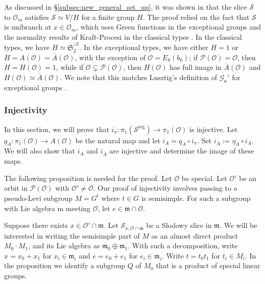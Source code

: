 \documentclass{amsart}
\theoremstyle{definition}
\DeclareMathOperator{\reg}{reg}
\newcommand{\cG}{\mathcal{G}}
\newcommand{\cP}{\mathcal{P}}
\newcommand{\cS}{\mathcal{S}}
\newcommand{\bc}{{\mathbf{c}}}
\newcommand{\m}{\mathrm{m}}
\newcommand{\sP}{\mathcal{P}}
\newcommand{\frakm}{\mathfrak{m}}
\newcommand{\frakS}{\mathfrak{S}}
\newcommand{\Ab}{\bar{A}}
\newcommand{\0}{\mathcal{O}}
\begin{document}
As discussed in \S\ref{subsec:new_general_set_up}, it was shown in \cite{FJLS23} that the slice $\cS$ to $\0_m$
satisfies $\cS \simeq V/H$ for a finite group $H$.
The proof relied on the fact that $\cS$ is unibranch at $x \in \0_m$, which uses Green functions in the exceptional groups
and the normality results of Kraft-Procesi in the classical types \cite{Kraft-Procesi:classical}.  In the classical types, we have $H \simeq \frakS^{|J|}_2$. In the exceptional types, we have either $H=1$ or $H=A(\0)=\Ab(\0)$, with the exception of $\0 = E_8(b_6)$; if $\cP(\0) = \0$, then $H=H(\0)=1$, while if $\0 \subsetneq \cP(\0)$, then $H(\0)$ has full image in $\Ab(\0)$ and $H(\0) \simeq \Ab(\0)$.
We note that this matches Lusztig's definition of $\cG_\bc'$ for exceptional groups \cite{Lusztig:unipotent}.

\subsubsection{Injectivity} \label{subsubsec:injective}
In this section, we will prove that 
$i_\pi: \pi_1(\cS^{\reg}) \to \pi_1(\0)$ is injective.
Let $q_A:\pi_1(\0) \to A(\0)$ be the natural map and let
$i_A = q_A\circ i_\pi$.   Set $i_{\Ab}:= \eta_A\circ i_A$.
We will also show that $i_A$ and $i_{\Ab}$ are injective and 
determine the image of these maps.

The following proposition is needed for the proof.
Let $\0$ be special.  Let $\0'$ be an orbit in $\sP(\0)$ with $\0' \neq \0$.
Our proof of injectivity involves passing to a pseudo-Levi subgroup 
$M=G^t$ where $t \in G$ is semisimple. 
For such a subgroup with Lie algebra $\m$ meeting $\0$, 
let $e \in \frakm \cap \0$.

Suppose there exists $x \in \0' \cap \frakm$.
Let $\cS_{x, \0 \cap \frakm}$ be a Slodowy slice in $\frakm$.
We will be interested in writing the semisimple part of $M$ as an almost direct product $M_0 \cdot M_1$, and its Lie algebra
as $\frakm_0 \oplus \frakm_1$. With such a decomposition, 
write $x = x_0 + x_1$ for $x_i \in \frakm_i$ and $e = e_0+e_1$ for $e_i \in \frakm_i$.
Write $t=t_0t_1$ for $t_i \in M_i$.
In the proposition we identify a subgroup $Q$ of $M_0$ that is a 
product of special linear groups.
\end{document}
